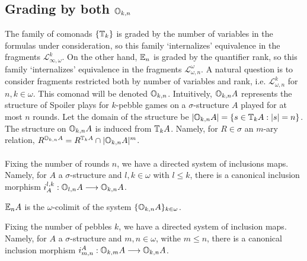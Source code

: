 \subsection{Grading by both ${\mathbb{O}_{k,n}}$}
The family of comonads $\{{\mathbb{T}_{k}}\}$ is graded by the number of variables in the formulas under consideration, so this family `internalizes' equivalence in the fragments $\mathcal{L}^{k}_{\infty,\omega}$. On the other hand, ${\mathbb{E}_{n}}$ is graded by the quantifier rank, so this family `internalizes' equivalence in the fragments $\mathcal{L}^{\omega}_{\omega,n}$. A natural question is to consider fragments restricted both by number of variables and rank, i.e. $\mathcal{L}^{k}_{\omega,n}$ for $n,k \in \omega$. This comonad will be denoted ${\mathbb{O}_{k,n}}$. Intuitively, ${\mathbb{O}_{k,n}A}$ represents the structure of Spoiler plays for $k$-pebble games on a $\sigma$-structure $A$ played for at most $n$ rounds. Let the domain of the structure be $|{\mathbb{O}_{k,n}A}| = \{s \in {\mathbb{T}_{k}A}: |s| = n\}$. The structure on ${\mathbb{O}_{k,n}A}$ is induced from ${\mathbb{T}_{k}A}$. Namely, for $R \in \sigma$ an $m$-ary relation, $R^{{\mathbb{O}_{k,n}A}} = R^{{\mathbb{T}_{k}A}} \cap |{\mathbb{O}_{k,n}A}|^{m}$. 
\\~\\
Fixing the number of rounds $n$, we have a directed system of inclusions maps. Namely, for $A$ a $\sigma$-structure and $l,k \in \omega$ with $l \leq k$, there is a canonical inclusion morphism $i^{l,k}_{A}:{\mathbb{O}_{l,n}A} \longrightarrow {\mathbb{O}_{k,n}A}$. \\  
\begin{prop}
${\mathbb{E}_{n}A}$ is the $\omega$-colimit of the system $\{{\mathbb{O}_{k,n}A}\}_{k \in \omega}$.
\end{prop}
Fixing the number of pebbles $k$, we have a directed system of inclusion maps. Namely, for $A$ a $\sigma$-structure and $m,n \in \omega$, withe $m \leq n$, there is a canonical inclusion morphism $i_{m,n}^{A}:{\mathbb{O}_{k,m}A} \longrightarrow {\mathbb{O}_{k,n}A}$. \\
